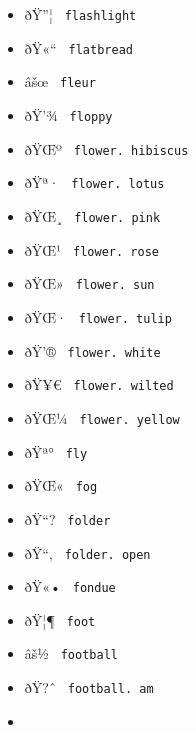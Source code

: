 \begin{itemize}
\item
  \label{symbol-flashlight}{{ ðŸ''¦ }
  \texttt{\ flashlight\ }}
\item
  \label{symbol-flatbread}{{ ðŸ«`` }
  \texttt{\ flatbread\ }}
\item
  \label{symbol-fleur}{{ âšœ } \texttt{\ fleur\ }}
\item
  \label{symbol-floppy}{{ ðŸ'¾ } \texttt{\ floppy\ }}
\item
  \label{symbol-flower.hibiscus}{{ ðŸŒº }
  \texttt{\ flower.\ hibiscus\ }}
\item
  \label{symbol-flower.lotus}{{ ðŸª· }
  \texttt{\ flower.\ lotus\ }}
\item
  \label{symbol-flower.pink}{{ ðŸŒ¸ }
  \texttt{\ flower.\ pink\ }}
\item
  \label{symbol-flower.rose}{{ ðŸŒ¹ }
  \texttt{\ flower.\ rose\ }}
\item
  \label{symbol-flower.sun}{{ ðŸŒ» }
  \texttt{\ flower.\ sun\ }}
\item
  \label{symbol-flower.tulip}{{ ðŸŒ· }
  \texttt{\ flower.\ tulip\ }}
\item
  \label{symbol-flower.white}{{ ðŸ'® }
  \texttt{\ flower.\ white\ }}
\item
  \label{symbol-flower.wilted}{{ ðŸ¥€ }
  \texttt{\ flower.\ wilted\ }}
\item
  \label{symbol-flower.yellow}{{ ðŸŒ¼ }
  \texttt{\ flower.\ yellow\ }}
\item
  \label{symbol-fly}{{ ðŸª° } \texttt{\ fly\ }}
\item
  \label{symbol-fog}{{ ðŸŒ« } \texttt{\ fog\ }}
\item
  \label{symbol-folder}{{ ðŸ``? } \texttt{\ folder\ }}
\item
  \label{symbol-folder.open}{{ ðŸ``‚ }
  \texttt{\ folder.\ open\ }}
\item
  \label{symbol-fondue}{{ ðŸ«• } \texttt{\ fondue\ }}
\item
  \label{symbol-foot}{{ ðŸ¦¶ } \texttt{\ foot\ }}
\item
  \label{symbol-football}{{ âš½ } \texttt{\ football\ }}
\item
  \label{symbol-football.am}{{ ðŸ?ˆ }
  \texttt{\ football.\ am\ }}
\item

\end{itemize}
